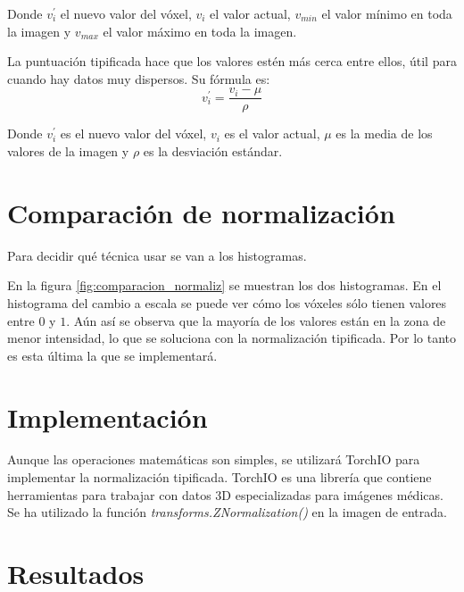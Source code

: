 Donde $v_i^{'}$ el nuevo valor del vóxel, $v_i$ el valor actual, $v_{min}$ el valor mínimo en toda la imagen y $v_{max}$ el valor máximo en toda la imagen.

La puntuación tipificada hace que los valores estén más cerca entre ellos, útil para cuando hay datos muy dispersos. Su fórmula es:
\begin{equation}
v_i^{'} = \frac{v_i - \mu}{\rho}
\end{equation}

Donde $v_i^{'}$ es el nuevo valor del vóxel, $v_i$ es el valor actual, $\mu$ es la media de los valores de la imagen y $\rho$ es la desviación estándar. \cite{znormalization}

\section{Comparación de normalización}\label{sec:normalization_compara}

Para decidir qué técnica usar se van a los histogramas.


En la figura \ref{fig:comparacion_normaliz} se muestran los dos histogramas. En el histograma del cambio a escala se puede ver cómo los vóxeles sólo tienen valores entre $0$ y $1$. Aún así se observa que la mayoría de los valores están en la zona de menor intensidad, lo que se soluciona con la normalización tipificada. Por lo tanto es esta última la que se implementará.

\section{Implementación}\label{sec:znormalization_implementation}

Aunque las operaciones matemáticas son simples, se utilizará TorchIO \cite{PerezGarcia2020} para implementar la normalización tipificada. TorchIO es una librería que contiene herramientas para trabajar con datos 3D especializadas para imágenes médicas. Se ha utilizado la función \textit{transforms.ZNormalization()} en la imagen de entrada.

\section{Resultados}\label{sec:apex_resultados}

